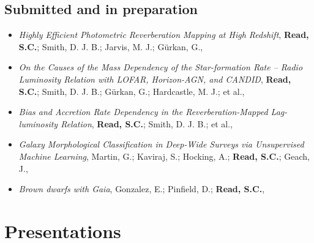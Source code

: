 \documentclass[letterpaper]{twentysecondcv} %
\begin{document}
\subsection{Submitted and in preparation}
\begin{itemize}

\item \textit{Highly Efficient Photometric Reverberation Mapping at High Redshift}, \textbf{Read, S.C.}; Smith, D. J. B.; Jarvis, M. J.; Gürkan, G., 


\item \textit{On the Causes of the Mass Dependency of the Star-formation Rate -- Radio Luminosity Relation with LOFAR, Horizon-AGN, and CANDID}, \textbf{Read, S.C.}; Smith, D. J. B.; Gürkan, G.; Hardcastle, M. J.; et al., 


\item \textit{Bias and Accretion Rate Dependency in the Reverberation-Mapped Lag-luminosity Relation}, \textbf{Read, S.C.}; Smith, D. J. B.; et al., 


\item \textit{Galaxy Morphological Classification in Deep-Wide Surveys via Unsupervised Machine Learning}, Martin, G.; Kaviraj, S.; Hocking, A.; \textbf{Read, S.C.}; Geach, J., 


\item \textit{Brown dwarfs with Gaia}, Gonzalez, E.; Pinfield, D.; \textbf{Read, S.C.}, 

\end{itemize}

\section{Presentations}
\begin{twenty}
    \\
    
    \\
    
    \\
    
    \\
\end{twenty}
\end{document}

